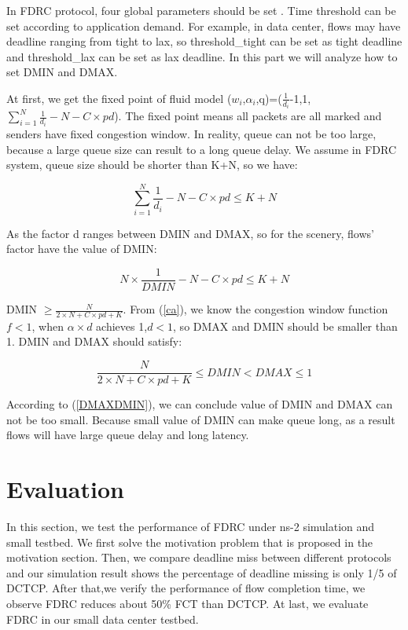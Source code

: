 \documentclass[10pt, conference, letterpaper]{IEEEtran}
\begin{document}
In FDRC protocol, four global parameters should be set . Time threshold can be set according to application demand.
For example, in data center, flows may have deadline ranging from tight to lax, so threshold\_tight can be set
as tight deadline and threshold\_lax can be set as lax deadline.
In this part we will analyze how to set DMIN and DMAX.

At first, we get the fixed point of fluid model ($w_i$,$\alpha_i$,q)=($\frac{1}{d_i}$-1,1,$\sum_{i=1}^N \frac{1}{d_i}-N-C\times pd$).
The fixed point means all packets are all marked and senders have fixed congestion window. 
In reality, queue can not be too large, because a large queue size can result to a long queue delay. 
We assume in FDRC system, queue size should be shorter than
K+N, so we have:


\begin{equation}
\label{queuelength}
\sum_{i=1}^N \frac{1}{d_i}-N-C\times pd \le K+N
\end{equation}

As the factor d ranges between DMIN and DMAX, so for the scenery, flows' factor have the value of DMIN:
  
\begin{equation}
\label{DMAXvalue}
N \times \frac{1}{DMIN}-N-C\times pd \le K+N
\end{equation}

DMIN $\ge \frac{N}{2\times N +C \times pd +K}$. From (\ref{ca}), we know the congestion window function $f<1$, when $\alpha \times d$ achieves 1,$d<1$,
so DMAX and DMIN should be smaller than 1. DMIN and DMAX should satisfy:

\begin{equation}
\label{DMAXDMIN}
\frac{N}{2\times N +C \times pd +K} \le DMIN < DMAX \le1
\end{equation}

According to (\ref{DMAXDMIN}), we can conclude value of DMIN and DMAX can not be too small. 
Because small value of DMIN can make queue long, as a result flows will have
large queue delay and long latency.

\section {Evaluation} \label{evaluation}

In this section, we test the performance of FDRC under ns-2 simulation and small testbed.
We first solve the motivation problem that is proposed in the motivation section.
Then, we compare deadline miss between different protocols and our simulation result shows the percentage of deadline missing is only 1/5 of DCTCP.
After that,we verify the performance of flow completion time, we observe FDRC reduces about 50\% FCT than DCTCP.
At last, we evaluate FDRC in our small data center testbed.
\end{document}
